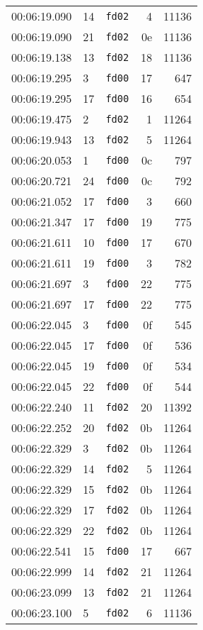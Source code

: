 \documentclass{article}
\begin{document}
\begin{longtable}{lllrr}
00:06:19.090 & 14 & \texttt{fd02} & 4 & 11136 \\
00:06:19.090 & 21 & \texttt{fd02} & 0e & 11136 \\
00:06:19.138 & 13 & \texttt{fd02} & 18 & 11136 \\
00:06:19.295 & 3 & \texttt{fd00} & 17 & 647 \\
00:06:19.295 & 17 & \texttt{fd00} & 16 & 654 \\
00:06:19.475 & 2 & \texttt{fd02} & 1 & 11264 \\
00:06:19.943 & 13 & \texttt{fd02} & 5 & 11264 \\
00:06:20.053 & 1 & \texttt{fd00} & 0c & 797 \\
00:06:20.721 & 24 & \texttt{fd00} & 0c & 792 \\
00:06:21.052 & 17 & \texttt{fd00} & 3 & 660 \\
00:06:21.347 & 17 & \texttt{fd00} & 19 & 775 \\
00:06:21.611 & 10 & \texttt{fd00} & 17 & 670 \\
00:06:21.611 & 19 & \texttt{fd00} & 3 & 782 \\
00:06:21.697 & 3 & \texttt{fd00} & 22 & 775 \\
00:06:21.697 & 17 & \texttt{fd00} & 22 & 775 \\
00:06:22.045 & 3 & \texttt{fd00} & 0f & 545 \\
00:06:22.045 & 17 & \texttt{fd00} & 0f & 536 \\
00:06:22.045 & 19 & \texttt{fd00} & 0f & 534 \\
00:06:22.045 & 22 & \texttt{fd00} & 0f & 544 \\
00:06:22.240 & 11 & \texttt{fd02} & 20 & 11392 \\
00:06:22.252 & 20 & \texttt{fd02} & 0b & 11264 \\
00:06:22.329 & 3 & \texttt{fd02} & 0b & 11264 \\
00:06:22.329 & 14 & \texttt{fd02} & 5 & 11264 \\
00:06:22.329 & 15 & \texttt{fd02} & 0b & 11264 \\
00:06:22.329 & 17 & \texttt{fd02} & 0b & 11264 \\
00:06:22.329 & 22 & \texttt{fd02} & 0b & 11264 \\
00:06:22.541 & 15 & \texttt{fd00} & 17 & 667 \\
00:06:22.999 & 14 & \texttt{fd02} & 21 & 11264 \\
00:06:23.099 & 13 & \texttt{fd02} & 21 & 11264 \\
00:06:23.100 & 5 & \texttt{fd02} & 6 & 11136 \\

\end{longtable}
\end{document}

